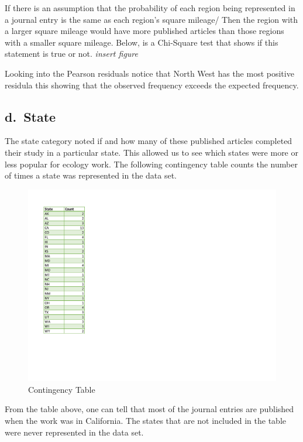 \documentclass[
]{article}
\begin{document}
If there is an assumption that the probability of each region being
represented in a journal entry is the same as each region's square
mileage/ Then the region with a larger square mileage would have more
published articles than those regions with a smaller square mileage.
Below, is a Chi-Square test that shows if this statement is true or not.
\emph{insert figure}

Looking into the Pearson residuals notice that North West has the most
positive residula this showing that the observed frequency exceeds the
expected frequency.

\hypertarget{d.-state}{%
\subsection{d.~State}\label{d.-state}}

The state category noted if and how many of these published articles
completed their study in a particular state. This allowed us to see
which states were more or less popular for ecology work. The following
contingency table counts the number of times a state was represented in
the data set.

\begin{figure}
  \caption{Contingency Table}
    \includegraphics[width=13cm]{statetable.pdf}
\end{figure}

From the table above, one can tell that most of the journal entries are
published when the work was in California. The states that are not
included in the table were never represented in the data set.
\end{document}
